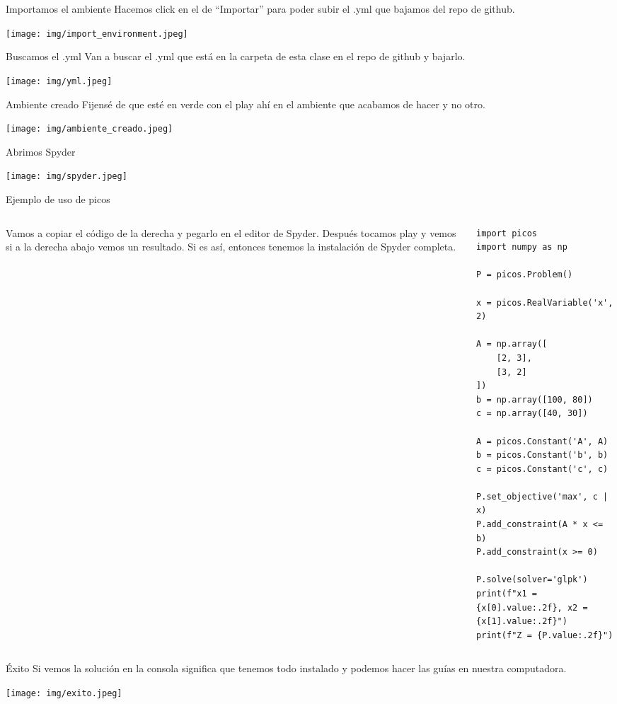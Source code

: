 \documentclass{beamer}
\begin{document}
\begin{frame}{Importamos el ambiente}
    Hacemos click en el de ``Importar'' para poder subir el .yml que bajamos del repo de github.
    \begin{center}
        \texttt{[image: img/import\_environment.jpeg]}
    \end{center}
\end{frame}

\begin{frame}{Buscamos el .yml}
    Van a buscar el .yml que está en la carpeta de esta clase en el repo de github y bajarlo.
    \begin{center}
        \texttt{[image: img/yml.jpeg]}
    \end{center}
\end{frame}

\begin{frame}{Ambiente creado}
    Fijensé de que esté en verde con el play ahí en el ambiente que acabamos de hacer y no otro.
    \begin{center}
        \texttt{[image: img/ambiente\_creado.jpeg]}
    \end{center}
\end{frame}

\begin{frame}{Abrimos Spyder}
    \begin{center}
        \texttt{[image: img/spyder.jpeg]}
    \end{center}
\end{frame}

\begin{frame}[fragile]{Ejemplo de uso de picos}
\begin{columns}
\begin{column}{0.45\textwidth}
Vamos a copiar el código de la derecha y pegarlo en el editor de Spyder. Después tocamos play y vemos si a la derecha abajo vemos un resultado. Si es así, entonces tenemos la instalación de Spyder completa.
\end{column}
\begin{column}{0.55\textwidth}
\begin{lstlisting}
import picos
import numpy as np

P = picos.Problem()

x = picos.RealVariable('x', 2)

A = np.array([
    [2, 3],
    [3, 2]
])
b = np.array([100, 80])
c = np.array([40, 30])

A = picos.Constant('A', A)
b = picos.Constant('b', b)
c = picos.Constant('c', c)

P.set_objective('max', c | x)
P.add_constraint(A * x <= b)
P.add_constraint(x >= 0)

P.solve(solver='glpk')
print(f"x1 = {x[0].value:.2f}, x2 = {x[1].value:.2f}")
print(f"Z = {P.value:.2f}")
\end{lstlisting}
\end{column}
\end{columns}
\end{frame}

\begin{frame}{Éxito}
    Si vemos la solución en la consola significa que tenemos todo instalado y podemos hacer las guías en nuestra computadora.
    \begin{center}
        \texttt{[image: img/exito.jpeg]}
    \end{center}
\end{frame}
\end{document}
